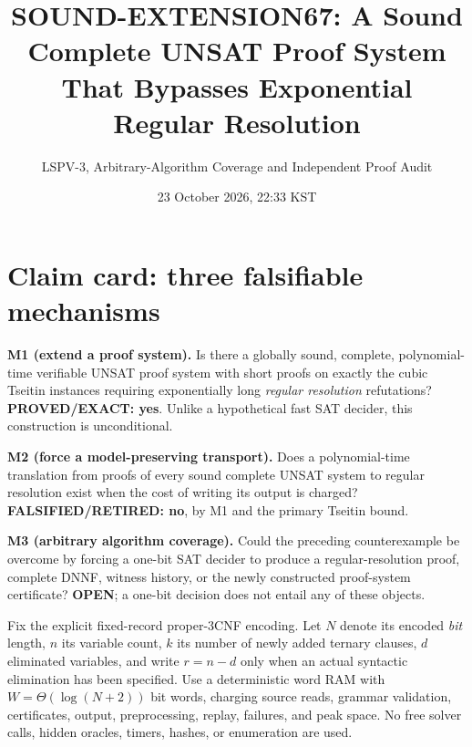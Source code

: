 \documentclass[11pt]{article}
\title{SOUND-EXTENSION67: A Sound Complete UNSAT Proof System That Bypasses Exponential Regular Resolution}
\author{LSPV-3, Arbitrary-Algorithm Coverage and Independent Proof Audit}
\date{23 October 2026, 22:33 KST}
\begin{document}
\maketitle
\begin{center}
\end{center}

\section{Claim card: three falsifiable mechanisms}
\noindent\textbf{M1 (extend a proof system).} Is there a globally sound, complete,
polynomial-time verifiable UNSAT proof system with short proofs on exactly
the cubic Tseitin instances requiring exponentially long \emph{regular
resolution} refutations? \textbf{PROVED/EXACT: yes}. Unlike a hypothetical
fast SAT decider, this construction is unconditional.

\noindent\textbf{M2 (force a model-preserving transport).} Does a polynomial-time
translation from proofs of every sound complete UNSAT system to regular
resolution exist when the cost of writing its output is charged?
\textbf{FALSIFIED/RETIRED: no}, by M1 and the primary Tseitin bound.

\noindent\textbf{M3 (arbitrary algorithm coverage).} Could the preceding
counterexample be overcome by forcing a one-bit SAT decider to produce a
regular-resolution proof, complete DNNF, witness history, or the newly
constructed proof-system certificate? \textbf{OPEN}; a one-bit decision
does not entail any of these objects.

Fix the explicit fixed-record proper-3CNF encoding. Let $N$ denote its
encoded \emph{bit} length, $n$ its variable count, $k$ its number of
newly added ternary clauses, $d$ eliminated variables, and write
$r=n-d$ only when an actual syntactic elimination has been specified.
Use a deterministic word RAM with $W=\Theta(\log(N+2))$ bit words,
charging source reads, grammar validation, certificates, output,
preprocessing, replay, failures, and peak space. No free solver calls,
hidden oracles, timers, hashes, or enumeration are used.
\end{document}
